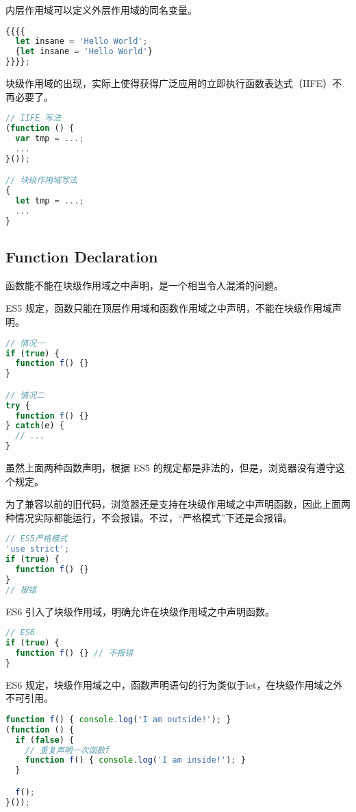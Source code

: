 内层作用域可以定义外层作用域的同名变量。

\begin{lstlisting}[language=JavaScript]
{{{{
  let insane = 'Hello World';
  {let insane = 'Hello World'}
}}}};
\end{lstlisting}

块级作用域的出现，实际上使得获得广泛应用的立即执行函数表达式（IIFE）不再必要了。


\begin{lstlisting}[language=JavaScript]
// IIFE 写法
(function () {
  var tmp = ...;
  ...
}());

// 块级作用域写法
{
  let tmp = ...;
  ...
}
\end{lstlisting}


\subsection{Function Declaration}


函数能不能在块级作用域之中声明，是一个相当令人混淆的问题。

ES5 规定，函数只能在顶层作用域和函数作用域之中声明，不能在块级作用域声明。

\begin{lstlisting}[language=JavaScript]
// 情况一
if (true) {
  function f() {}
}

// 情况二
try {
  function f() {}
} catch(e) {
  // ...
}
\end{lstlisting}

虽然上面两种函数声明，根据 ES5 的规定都是非法的，但是，浏览器没有遵守这个规定。

为了兼容以前的旧代码，浏览器还是支持在块级作用域之中声明函数，因此上面两种情况实际都能运行，不会报错。不过，“严格模式”下还是会报错。

\begin{lstlisting}[language=JavaScript]
// ES5严格模式
'use strict';
if (true) {
  function f() {}
}
// 报错
\end{lstlisting}

ES6 引入了块级作用域，明确允许在块级作用域之中声明函数。



\begin{lstlisting}[language=JavaScript]
// ES6
if (true) {
  function f() {} // 不报错
}
\end{lstlisting}

ES6 规定，块级作用域之中，函数声明语句的行为类似于let，在块级作用域之外不可引用。


\begin{lstlisting}[language=JavaScript]
function f() { console.log('I am outside!'); }
(function () {
  if (false) {
    // 重复声明一次函数f
    function f() { console.log('I am inside!'); }
  }

  f();
}());
\end{lstlisting}


